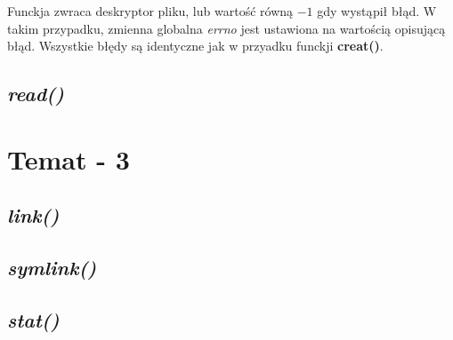 \documentclass{article}
\begin{document}
Funckja zwraca deskryptor pliku, lub wartość równą $-1$ gdy wystąpił błąd.
W takim przypadku, zmienna globalna \textit{errno} jest ustawiona na wartością opisującą błąd.
Wszystkie błędy są identyczne jak w przyadku funckji \textbf{creat()}.

\subsection{\textit{read()}}

\section{Temat - 3}
\subsection{\textit{link()}}
\subsection{\textit{symlink()}}
\subsection{\textit{stat()}}
\end{document}
